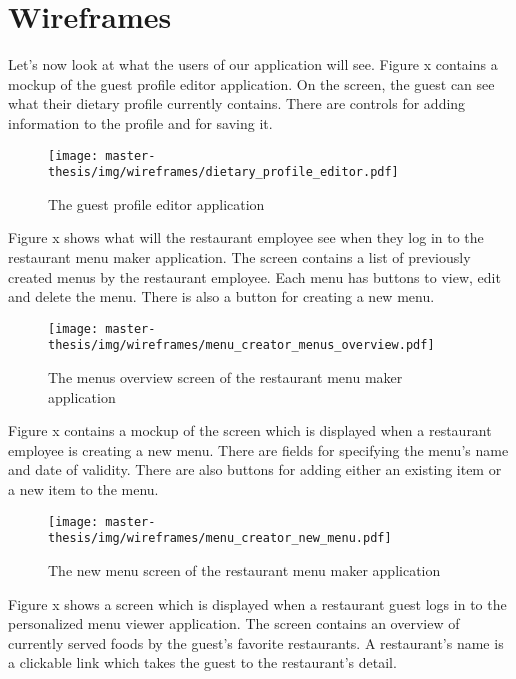 \section{Wireframes}
Let's now look at what the users of our application will see.
Figure x contains a mockup of the guest profile editor application.
On the screen, the guest can see what their dietary profile currently contains.
There are controls for adding information to the profile and for saving it.

\begin{figure}[h]
  \centering
  \texttt{[image: master-thesis/img/wireframes/dietary\_profile\_editor.pdf]}
  \caption{The guest profile editor application}
\end{figure}

Figure x shows what will the restaurant employee see when they log in to the restaurant menu maker application.
The screen contains a list of previously created menus by the restaurant employee.
Each menu has buttons to view, edit and delete the menu.
There is also a button for creating a new menu.

\begin{figure}[h]
  \centering
  \texttt{[image: master-thesis/img/wireframes/menu\_creator\_menus\_overview.pdf]}
  \caption{The menus overview screen of the restaurant menu maker application}
\end{figure}

Figure x contains a mockup of the screen which is displayed when a restaurant employee is creating a new menu.
There are fields for specifying the menu's name and date of validity.
There are also buttons for adding either an existing item or a new item to the menu.

\begin{figure}[h]
  \centering
  \texttt{[image: master-thesis/img/wireframes/menu\_creator\_new\_menu.pdf]}
  \caption{The new menu screen of the restaurant menu maker application}
\end{figure}

Figure x shows a screen which is displayed when a restaurant guest logs in to the personalized menu viewer application.
The screen contains an overview of currently served foods by the guest's favorite restaurants.
A restaurant's name is a clickable link which takes the guest to the restaurant's detail.

